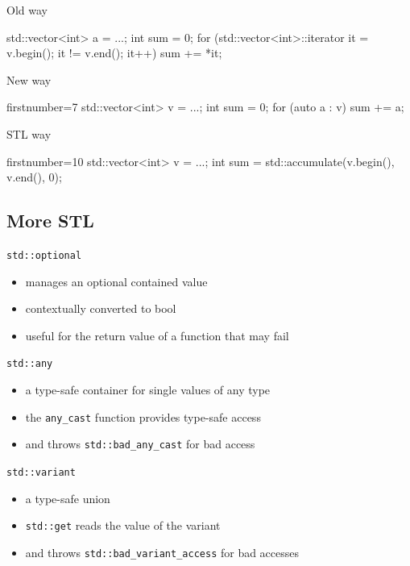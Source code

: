 \begin{frame}[fragile]
  \begin{block}{Old way}
    \begin{cppcode*}{}
      std::vector<int> a = ...;
      int sum = 0;
      for (std::vector<int>::iterator it = v.begin();
           it != v.end(); it++) {
        sum += *it;
      }
    \end{cppcode*}
  \end{block}
  \pause
  \begin{block}{New way}
    \begin{cppcode*}{firstnumber=7}
      std::vector<int> v = ...;
      int sum = 0;
      for (auto a : v) { sum += a; }
    \end{cppcode*}
  \end{block}
  \pause
  \begin{exampleblock}{STL way}
    \begin{cppcode*}{firstnumber=10}
      std::vector<int> v = ...;
      int sum = std::accumulate(v.begin(), v.end(), 0);
    \end{cppcode*}
  \end{exampleblock}
\end{frame}

\subsection{More STL}

\begin{frame}[fragile]
  \begin{block}{\texttt{std::optional}}
    \begin{itemize}
    \item manages an optional contained value
    \item contextually converted to bool
    \item useful for the return value of a function that may fail
    \end{itemize}
  \end{block}
  \begin{block}{\texttt{std::any}}
    \begin{itemize}
    \item a type-safe container for single values of any type
    \item the \texttt{any\_cast} function provides type-safe access
    \item and throws \texttt{std::bad\_any\_cast} for bad access
    \end{itemize}
  \end{block}
  \begin{block}{\texttt{std::variant}}
    \begin{itemize}
    \item a type-safe union
    \item \texttt{std::get} reads the value of the variant
    \item and throws \texttt{std::bad\_variant\_access} for bad accesses
    \end{itemize}
  \end{block}
\end{frame}

